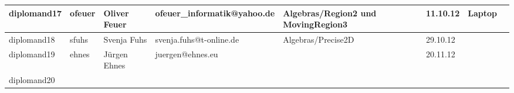 \documentclass[a4paper,9pt,landscape]{scrartcl}
\begin{document}
\begin{table}
\begin{tabularx}{\textwidth}{|l|l|l|l|l|X|l|l|}
\hline
\hline
\rowcolor{yellow}\cellcolor{red}diplomand17 &ofeuer                     &Oliver Feuer      &ofeuer\_informatik@yahoo.de&Algebras/Region2 und MovingRegion3&11.10.12&\cellcolor{red}Laptop\\
\hline
\hline
\rowcolor{yellow}\cellcolor{red}diplomand18&sfuhs                       &Svenja Fuhs        &svenja.fuhs@t-online.de  &Algebras/Precise2D       &29.10.12&\\
\hline
\hline
\rowcolor{yellow}\cellcolor{red}diplomand19&ehnes                       &J\"urgen Ehnes     &juergen@ehnes.eu         &                         &20.11.12&\\
\hline
\hline
\cellcolor{green}diplomand20&                          &                   &                          &                        &         &\\
\hline
\hline
  \end{tabularx}
\end{table}
\end{document}
